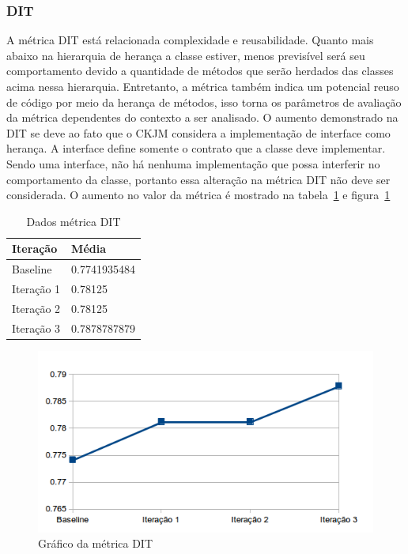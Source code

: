 \documentclass[conference]{IEEEtran}
\begin{document}


\subsubsection{DIT}

A métrica DIT está relacionada complexidade e reusabilidade. Quanto mais
abaixo na hierarquia de herança a classe estiver, menos previsível será seu
comportamento devido a quantidade de métodos que serão herdados das classes
acima nessa hierarquia. Entretanto, a métrica também indica um potencial reuso
de código por meio da herança de métodos, isso torna os parâmetros de avaliação
da métrica dependentes do contexto a ser analisado. O aumento demonstrado na DIT
se deve ao fato que o CKJM considera a implementação de interface como herança.
A interface define somente o contrato que a classe deve implementar. Sendo uma
interface, não há nenhuma implementação que possa interferir no comportamento
da classe, portanto essa alteração na métrica DIT não deve ser considerada. O
aumento no valor da métrica é mostrado na tabela~\ref{tab:dit} e
figura~\ref{fig:dit}

\begin{table}[!h]
	\centering
	    \caption{\label{tab:dit} Dados métrica DIT}
    \begin{tabular}{ | l | l | }
    \hline
    Iteração & Média 			\\ \hline
    Baseline & 0.7741935484  	\\ \hline
    Iteração 1 & 0.78125		\\ \hline
	Iteração 2 & 0.78125			\\ \hline
	Iteração 3 & 0.7878787879	\\ \hline
    \end{tabular}
    
\end{table}

\begin{figure}[!htb]
	\begin{center}
		\includegraphics[scale=0.7]{img/dit.png}
	\end{center}
	
	\caption{\label{fig:dit} Gráfico da métrica DIT}   
\end{figure}
\end{document}
